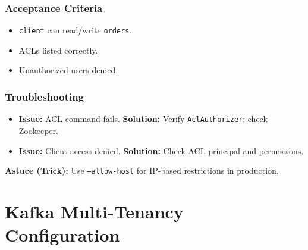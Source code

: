 \documentclass[12pt,a4paper]{report}
\begin{document}
\subsection{Acceptance Criteria}
\begin{itemize}
    \item \texttt{client} can read/write \texttt{orders}.
    \item ACLs listed correctly.
    \item Unauthorized users denied.
\end{itemize}

\subsection{Troubleshooting}
\begin{itemize}
    \item \textbf{Issue:} ACL command fails.
      \textbf{Solution:} Verify \texttt{AclAuthorizer}; check Zookeeper.
    \item \textbf{Issue:} Client access denied.
      \textbf{Solution:} Check ACL principal and permissions.
\end{itemize}

\begin{framed}
\textbf{Astuce (Trick):} Use \texttt{--allow-host} for IP-based restrictions in production.
\end{framed}

\chapter{Kafka Multi-Tenancy Configuration}
\end{document}
